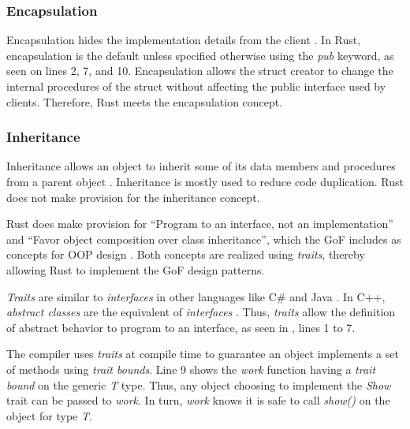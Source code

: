 \subsubsection{Encapsulation}
Encapsulation hides the implementation details from the client \cite{klabnik_2019_01,meyer_97_01,savitch_15_01}.
In Rust, encapsulation is the default unless specified otherwise using the \textit{pub} keyword, as seen on lines 2, 7, and 10.
Encapsulation allows the struct creator to change the internal procedures of the struct without affecting the public interface used by clients.
Therefore, Rust meets the encapsulation concept.

\subsubsection{Inheritance}
Inheritance allows an object to inherit some of its data members and procedures from a parent object \cite{meyer_97_01,stefik_85_01,gamma_94_01,savitch_15_01}.
Inheritance is mostly used to reduce code duplication.
Rust does not make provision for the inheritance concept.

Rust does make provision for ``Program to an interface, not an implementation'' and ``Favor object composition over class inheritance'', which the GoF includes as concepts for OOP design \cite{gamma_94_01}.
Both concepts are realized using \textit{traits}, thereby allowing Rust to implement the GoF design patterns.

\textit{Traits} are similar \cite{klabnik_2019_01} to \textit{interfaces} in other languages like C\# \cite{robinson_04_01} and Java \cite{gosling_96_01}.
In C++, \textit{abstract classes} are the equivalent of \textit{interfaces} \cite{malik_09_01,stroustrup_13_01,alexandrescu_01_01}.
Thus, \textit{traits} allow the definition of abstract behavior to program to an interface, as seen in , lines 1 to 7.


The compiler uses \textit{traits} at compile time to guarantee an object implements a set of methods using \textit{trait bounds}.
Line 9 shows the \textit{work} function having a \textit{trait bound} on the generic \textit{T} type.
Thus, any object choosing to implement the \textit{Show} trait can be passed to \textit{work}.
In turn, \textit{work} knows it is safe to call \textit{show()} on the object for type \textit{T}.


